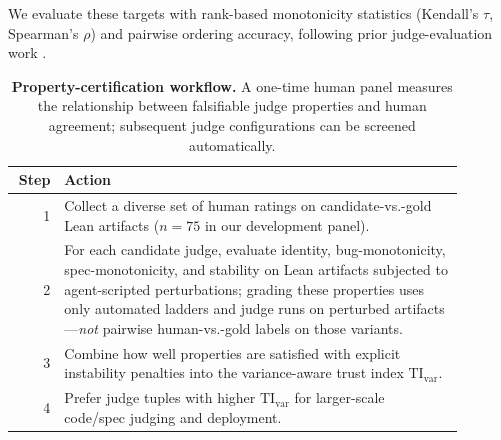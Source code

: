 \documentclass{article}
\begin{document}
We evaluate these targets with rank-based monotonicity statistics (Kendall's $\tau$, Spearman's $\rho$) and pairwise ordering accuracy, following prior judge-evaluation work \citep{TongZhang2024CodeJudge,Zhuo2024ICEScore}.

\begin{table}[t]
  \centering
  \small
  \begin{tabular}{@{}r@{\kern 7pt}>{\raggedright\arraybackslash} p{0.89\linewidth}@{}}
    \toprule
    \textbf{Step} & \textbf{Action}                                                                                                                                                                                                                                                                                      \\
    \midrule
    1             &
    Collect a diverse set of human ratings on candidate-vs.-gold Lean artifacts (\(n{=}75\) in our development panel).                                                                                                                                                                                                         \\
    2             &
    For each candidate judge, evaluate identity, bug-monotonicity, spec-monotonicity, and stability on Lean artifacts subjected to agent-scripted perturbations; grading these properties uses only automated ladders and judge runs on perturbed artifacts—\emph{not} pairwise human-vs.-gold labels on those variants. \\
    3             &
    Combine how well properties are satisfied with explicit instability penalties into the variance-aware trust index \(\mathrm{TI}_{\mathrm{var}}\).                                                                                                                                                                    \\
    4             &
    Prefer judge tuples with higher \(\mathrm{TI}_{\mathrm{var}}\) for larger-scale code/spec judging and deployment.                                                                                                                                                                                                    \\
    \bottomrule
  \end{tabular}
  \caption{\textbf{Property-certification workflow.}
    A one-time human panel measures the relationship between falsifiable judge properties
    and human agreement; subsequent judge configurations can be screened automatically.}
  \label{tab:protocol_workflow}
\end{table}
\end{document}
